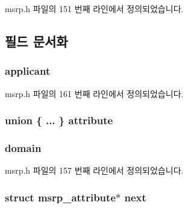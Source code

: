 msrp.\+h 파일의 151 번째 라인에서 정의되었습니다.



\subsection{필드 문서화}
\subsubsection[{\texorpdfstring{applicant}{applicant}}]{ applicant}\hypertarget{structmsrp__attribute_a9ee7e01253c78c410bf44f18a6372d92}{}\label{structmsrp__attribute_a9ee7e01253c78c410bf44f18a6372d92}


msrp.\+h 파일의 161 번째 라인에서 정의되었습니다.

\subsubsection[{\texorpdfstring{attribute}{attribute}}]{\setlength{\rightskip}{0pt plus 5cm}union \{ ... \}   attribute}\hypertarget{structmsrp__attribute_a3ef689bda345890720a9e52cc01a46d3}{}\label{structmsrp__attribute_a3ef689bda345890720a9e52cc01a46d3}
\subsubsection[{\texorpdfstring{domain}{domain}}]{ domain}\hypertarget{structmsrp__attribute_aa7d094869072ffd53218ef7d106eb7ae}{}\label{structmsrp__attribute_aa7d094869072ffd53218ef7d106eb7ae}


msrp.\+h 파일의 157 번째 라인에서 정의되었습니다.

\subsubsection[{\texorpdfstring{next}{next}}]{\setlength{\rightskip}{0pt plus 5cm}struct {\bf msrp\+\_\+attribute}$\ast$ next}\hypertarget{structmsrp__attribute_aee93bf3c35daae5c99a5157c87f4b7cb}{}\label{structmsrp__attribute_aee93bf3c35daae5c99a5157c87f4b7cb}


